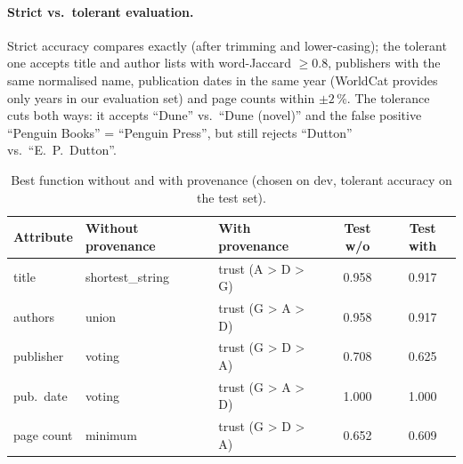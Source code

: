 \documentclass[a4paper,11pt]{article}
\begin{document}
\paragraph{Strict vs.\ tolerant evaluation.}
Strict accuracy compares exactly (after trimming and lower-casing); the tolerant
one accepts title and author lists with word-Jaccard $\geq 0.8$, publishers with the
same normalised name, publication dates in the same year (WorldCat provides only
years in our evaluation set) and page counts within $\pm 2\,\%$.
The tolerance cuts both ways: it accepts ``Dune'' vs.\ ``Dune (novel)'' and the
false positive ``Penguin Books'' = ``Penguin Press'', but still rejects
``Dutton'' vs.\ ``E.\ P.\ Dutton''.


\begin{table}[t]
\centering
\caption{Best function without and with provenance (chosen on dev, tolerant
accuracy on the test set).}
\label{tab:prov}
\small
\begin{tabular}{lllcc}
\toprule
Attribute & Without provenance & With provenance & Test w/o & Test with \\
\midrule
title       & shortest\_string & trust (A > D > G) & 0.958 & 0.917 \\
authors     & union            & trust (G > A > D) & 0.958 & 0.917 \\
publisher   & voting           & trust (G > D > A) & 0.708 & 0.625 \\
pub.\ date  & voting           & trust (G > A > D) & 1.000 & 1.000 \\
page count  & minimum          & trust (G > D > A) & 0.652 & 0.609 \\
\bottomrule
\end{tabular}
\end{table}
%
\end{document}
